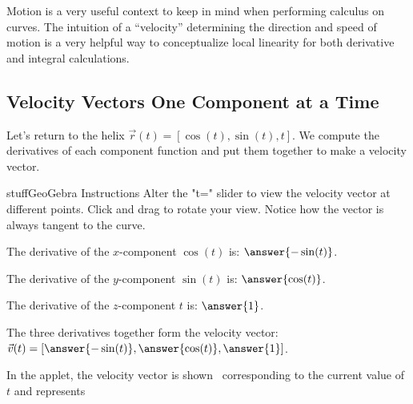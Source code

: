 \documentclass{ximera}
\begin{document}
Motion is a very useful context to keep in mind when performing calculus on curves. The intuition of a ``velocity'' determining the direction and speed of motion is a very helpful way to conceptualize local linearity for both derivative and integral calculations.

\subsection*{Velocity Vectors One Component at a Time}

Let's return to the helix $\vec{r}(t) = [ \cos(t), \sin(t), t ]$. We compute the derivatives of each component function and put them together to make a velocity vector.

\begin{problem}

\begin{expandable}{stuff}{GeoGebra Instructions}
    Alter the "t=" slider to view the velocity vector at different points. Click and drag to rotate your view. Notice how the vector is always tangent to the curve.
\end{expandable}

\begin{center}
\end{center}

The derivative of the $x$-component $\cos(t)$ is: $\answer{-\sin(t)}$.

The derivative of the $y$-component $\sin(t)$ is: $\answer{\cos(t)}$.

The derivative of the $z$-component $t$ is: $\answer{1}$.

The three derivatives together form the velocity vector: $\vec{v}(t) = [\answer{-\sin(t)}, \answer{\cos(t)}, \answer{1}]$.

In the applet, the velocity vector is shown \  corresponding to the current value of $t$ and represents \begin{selectAll}
\end{selectAll}
\end{problem}
\end{document}
